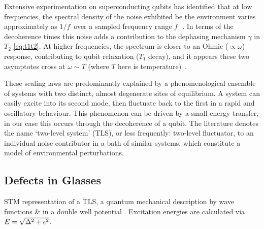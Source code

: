 Extensive experimentation on superconducting qubits has identified that at low frequencies, the spectral density of the noise exhibited be the environment varies approximately as $1/f\,$ over a sampled frequency range $f\,$~\cite{Dutta1981}.
In terms of the decoherence times this noise adds a contribution to the dephasing mechanism $\gamma$ in $T_2$ \cref{eq:t1t2}.
At higher frequencies, the spectrum is closer to an Ohmic ($\propto \omega$) response, contributing to qubit relaxation ($T_1$ decay), and it appears these two asymptotes cross at $\omega \sim T$ (where $T$ here is temperature)~\cite{Astafiev2004}.

These scaling laws are predominantly explained by a phenomenological ensemble of systems with two distinct, almost degenerate sites of equilibrium.
A system can easily excite into its second mode, then fluctuate back to the first in a rapid and oscillatory behaviour.
This phenomenon can be driven by a small energy transfer, in our case this occurs through the decoherence of a qubit.
The literature denotes the name `two-level system' (TLS), or less frequently: two-level fluctuator, to an individual noise contributor in a bath of similar systems, which constitute a model of environmental perturbations.

\subsection{Defects in Glasses}

\begin{marginfigure}
\resizebox{\marginparwidth}{!}{}
\caption[STM Picture of a TLS]{\label{fig:stmtls}STM representation of a TLS, a quantum mechanical description by wave functions  \&  in a double well potential . Excitation energies are calculated via $\cramped{E = \sqrt{\Delta^2+\epsilon^2}}$.}
\end{marginfigure}

